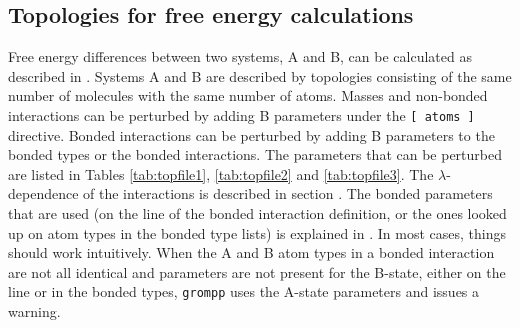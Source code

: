 \subsection{Topologies for free energy calculations}
Free energy differences between two systems, A and B, can be calculated as
described in .
Systems A and B are described by topologies
consisting of the same number of molecules with the same number of
atoms. Masses and non-bonded interactions can be perturbed by adding B
parameters under the {\tt [~atoms~]} directive. Bonded interactions can be 
perturbed by adding B parameters to the bonded types or the bonded
interactions. The parameters that can be perturbed are listed in  
Tables \ref{tab:topfile1}, \ref{tab:topfile2} and \ref{tab:topfile3}.
The $\lambda$-dependence of the interactions is described
in section .
The bonded parameters that are used (on the line of the bonded
interaction definition, or the ones looked up on atom types
in the bonded type lists) is explained in .
In most cases, things should work intuitively.
When the A and B atom types in a bonded interaction
are not all identical and parameters are not present for the B-state,
either on the line or in the bonded types,
{\tt grompp} uses the A-state parameters and issues a warning.

